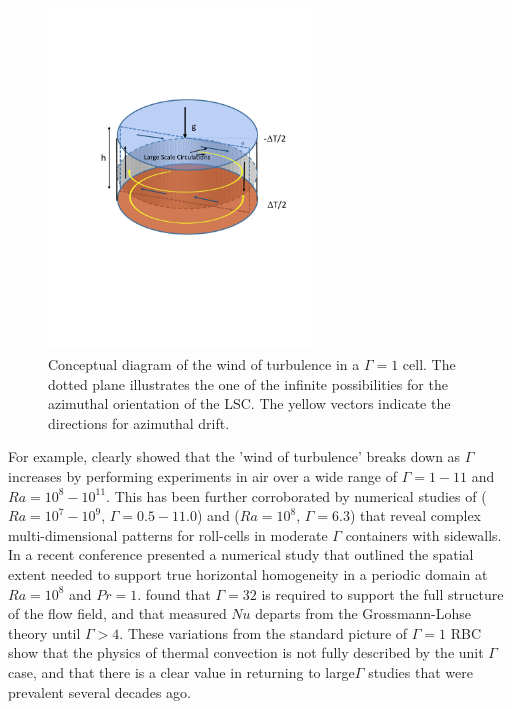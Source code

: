 \documentclass[twocolumn,10pt]{tsfp}
\begin{document}
\begin{figure}
\centering
\includegraphics[trim=4cm 9cm 2cm 6cm, clip, width=7cm]{Ar1Sym}
\caption{Conceptual diagram of the wind of turbulence in a $\Gamma=1$ cell. The dotted plane illustrates the one of the infinite possibilities for the azimuthal orientation of the LSC. The yellow vectors indicate the directions for azimuthal drift.}
\label{fig:1ar}
\end{figure}


For example, \cite{dupuits2007breakdown} clearly showed that the 'wind of turbulence' breaks down as $\Gamma$ increases by performing experiments in air over a wide range of $\Gamma=1-11$ and $Ra=10^8-10^11$.
This has been further corroborated by numerical studies of \cite{bailon2010aspect} ($Ra=10^7-10^9$, $\Gamma=0.5-11.0$)  and \cite{sakievich2016large} ($Ra=10^8$, $\Gamma=6.3$) that reveal complex multi-dimensional patterns for roll-cells in moderate $\Gamma$ containers with sidewalls.  
In a recent conference \cite{stevens2016superstructures} presented a numerical study that outlined the spatial extent needed to support true horizontal homogeneity in a periodic domain at $Ra=10^8$ and $Pr=1$.  
\cite{stevens2016superstructures} found that $\Gamma=32$ is required to support the full structure of the flow field, and that measured $Nu$ departs from the Grossmann-Lohse theory until $\Gamma>4$.  
These variations from the standard picture of $\Gamma=1$ RBC show that the physics of thermal convection is not fully described by the unit $\Gamma$ case, and that there is a clear value in returning to large$\Gamma$ studies that were prevalent several decades ago.
\end{document}
